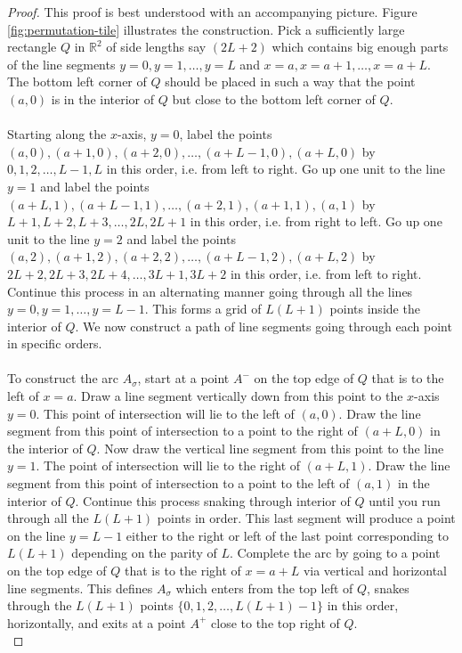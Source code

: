 \documentclass[11pt,a4paper]{amsart}
\theoremstyle{definition}
\theoremstyle{remark}
\begin{document}
\begin{proof}
This proof is best understood with an accompanying picture.  Figure \ref{fig:permutation-tile} illustrates the construction.  Pick a sufficiently large rectangle $Q$ in $\mathbb{R}^{2}$ of side lengths say $(2L+2)$ which contains big enough parts of the line segments $y = 0, y = 1, \hdots, y = L$ and $x = a, x = a + 1, \hdots, x = a+L$.  The bottom left corner of $Q$ should be placed in such a way that the point $(a,0)$ is in the interior of $Q$ but close to the bottom left corner of $Q$.  \\
\\
Starting along the $x$-axis, $y=0$, label the points $(a,0), (a+1,0), (a+2,0),\hdots, (a+L-1,0), (a+L,0)$ by $0,1,2,\hdots, L-1,L$ in this order, i.e. from left to right.  Go up one unit to the line $y = 1$ and label the points $(a+L,1), (a+L-1,1), \hdots, (a+2,1), (a+1,1), (a,1)$ by $L+1, L+2, L+3, \hdots, 2L, 2L+1$ in this order, i.e. from right to left.  Go up one unit to the line $y = 2$ and label the points $(a,2), (a+1,2), (a+2,2),\hdots, (a+L-1,2), (a+L,2)$ by $2L+2, 2L+3, 2L+4,\hdots, 3L+1, 3L+2$ in this order, i.e. from left to right.  Continue this process in an alternating manner going through all the lines $y = 0, y = 1, \hdots , y = L-1$.  This forms a grid of $L(L+1)$ points inside the interior of $Q$.  We now construct a path of line segments going through each point in specific orders.  \\
\\
To construct the arc $A_{\sigma}$, start at a point $A^{-}$ on the top edge of $Q$ that is to the left of $x = a$.  Draw a line segment vertically down from this point to the $x$-axis $y = 0$.  This point of intersection will lie to the left of $(a,0)$.  Draw the line segment from this point of intersection to a point to the right of $(a+L,0)$ in the interior of $Q$.  Now draw the vertical line segment from this point to the line $y = 1$.  The point of intersection will lie to the right of $(a+L,1)$.  Draw the line segment from this point of intersection to a point to the left of $(a,1)$ in the interior of $Q$.  Continue this process snaking through interior of $Q$ until you run through all the $L(L+1)$ points in order.  This last segment will produce a point on the line $y = L-1$ either to the right or left of the last point corresponding to $L(L+1)$ depending on the parity of $L$.  Complete the arc by going to a point on the top edge of $Q$ that is to the right of $x = a+L$ via vertical and horizontal line segments.  This defines $A_{\sigma}$ which enters from the top left of $Q$, snakes through the $L(L+1)$ points $\{0,1,2,\hdots, L(L+1)-1\}$ in this order, horizontally, and exits at a point $A^{+}$ close to the top right of $Q$.  \\

\end{proof}
\end{document}
